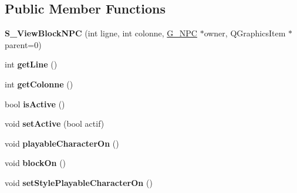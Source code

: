 \subsection*{Public Member Functions}
\begin{DoxyCompactItemize}
\item 
\hypertarget{class_s___view_block_n_p_c_a31fc7d9d84317a99cdd50c93cd413c1d}{}{\bfseries S\+\_\+\+View\+Block\+N\+P\+C} (int ligne, int colonne, \hyperlink{class_g___n_p_c}{G\+\_\+\+N\+P\+C} $\ast$owner, Q\+Graphics\+Item $\ast$parent=0)\label{class_s___view_block_n_p_c_a31fc7d9d84317a99cdd50c93cd413c1d}

\item 
\hypertarget{class_s___view_block_n_p_c_a32c2bf2773dfb42611e5b029a98f9b3f}{}int {\bfseries get\+Line} ()\label{class_s___view_block_n_p_c_a32c2bf2773dfb42611e5b029a98f9b3f}

\item 
\hypertarget{class_s___view_block_n_p_c_ab6a88434bbcb808b801994bc320b5981}{}int {\bfseries get\+Colonne} ()\label{class_s___view_block_n_p_c_ab6a88434bbcb808b801994bc320b5981}

\item 
\hypertarget{class_s___view_block_n_p_c_a59c007ce0c4eaae6e361f65bb7782289}{}bool {\bfseries is\+Active} ()\label{class_s___view_block_n_p_c_a59c007ce0c4eaae6e361f65bb7782289}

\item 
\hypertarget{class_s___view_block_n_p_c_aa8cc7f8d5958a998ce6eb7db6b20031a}{}void {\bfseries set\+Active} (bool actif)\label{class_s___view_block_n_p_c_aa8cc7f8d5958a998ce6eb7db6b20031a}

\item 
\hypertarget{class_s___view_block_n_p_c_aaa7984976e743660e694b860cc6122de}{}void {\bfseries playable\+Character\+On} ()\label{class_s___view_block_n_p_c_aaa7984976e743660e694b860cc6122de}

\item 
\hypertarget{class_s___view_block_n_p_c_a97f4bbd45d4768a2cf7b31ec36197ef1}{}void {\bfseries block\+On} ()\label{class_s___view_block_n_p_c_a97f4bbd45d4768a2cf7b31ec36197ef1}

\item 
\hypertarget{class_s___view_block_n_p_c_a8b5b1c08526115e555f49c292fabb59f}{}void {\bfseries set\+Style\+Playable\+Character\+On} ()\label{class_s___view_block_n_p_c_a8b5b1c08526115e555f49c292fabb59f}

\end{DoxyCompactItemize}
